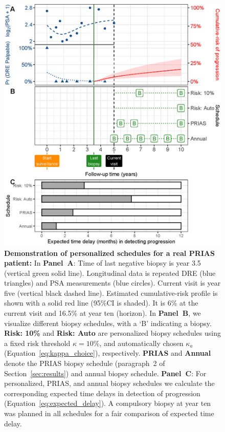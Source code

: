 \begin{figure}
\centerline{\includegraphics{images/demo_schedule.eps}}
\caption{\textbf{Demonstration of personalized schedules for a real PRIAS patient:} In \textbf{Panel~A}: Time of last negative biopsy is year 3.5 (vertical green solid line). Longitudinal data is repeated DRE (blue triangles) and PSA measurements (blue circles). Current visit is year five (vertical black dashed line). Estimated cumulative-risk profile is shown with a solid red line (95\%CI is shaded). It is 6\% at the current visit and 16.5\% at year ten (horizon). In \textbf{Panel~B}, we visualize different biopsy schedules, with a `B' indicating a biopsy. \textbf{Risk: 10\%} and \textbf{Risk: Auto} are personalized biopsy schedules using a fixed risk threshold $\kappa=10\%$, and automatically chosen $\kappa_a$ (Equation~\ref{eq:kappa_choice}), respectively. \textbf{PRIAS} and \textbf{Annual} denote the PRIAS biopsy schedule (paragraph~2 of Section~\ref{sec:results}) and annual biopsy schedule. \textbf{Panel~C}: For personalized, PRIAS, and annual biopsy schedules we calculate the corresponding expected time delays in detection of progression (Equation~\ref{eq:expected_delay}). A compulsory biopsy at year ten was planned in all schedules for a fair comparison of expected time delay.} 
\label{fig:demo_schedule}
\end{figure}

